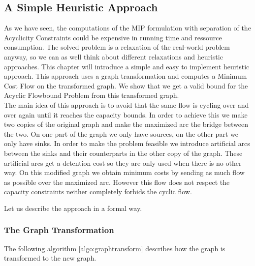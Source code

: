 \newpage
\subsection{A Simple Heuristic Approach}

As we have seen, the computations of the MIP formulation with separation of the Acyclicity Constraints could be 
expensive in running time and ressource consumption. The solved problem is a relaxation of the real-world 
problem anyway, so we can as well think 
about different relaxations and heuristic approaches. This chapter will introduce a simple and easy to 
implement heuristic approach. This approach uses a graph transformation and computes a Minimum Cost Flow on the 
transformed graph. We show that we get a valid bound for the Acyclic Flowbound Problem from this transformed graph.\\

The main idea of this approach is to avoid that the same flow is cycling over and over again until it reaches the 
capacity bounds. In order to achieve this we make two copies of the original graph and make the maximized arc the 
bridge between the two. On one part of the graph we only have sources, on the other part we only have sinks. 
In order to make the problem feasible we introduce artificial arcs between the sinks and their counterparts in the other 
copy of the graph. These artificial arcs get a detention cost so they are only used when there is no other way. On this 
modified graph we obtain minimum costs by sending as much flow as possible over the maximized arc. However this flow 
does not respect the capacity constraints neither completely forbids the cyclic flow. 

Let us describe the approach in a formal way.

\subsubsection*{The Graph Transformation}

The following algorithm \ref{algo:graphtransform} describes how the graph is transformed to the new graph.

